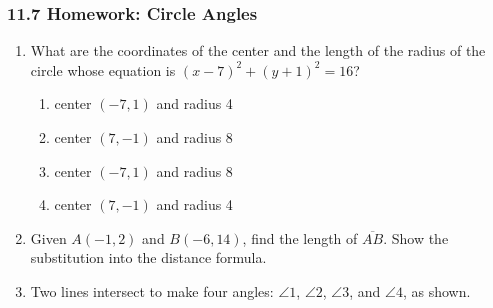 

\fancyhead[LE]{\thepage}



\subsubsection*{11.7 Homework: Circle Angles}
\begin{enumerate}
\item What are the coordinates of the center and the length of the radius of the circle whose equation is $(x-7)^2+(y+1)^2=16$?
  \begin{enumerate}[itemsep=0.25cm]
    \item center $(-7,1)$ and radius 4
    \item center $(7,-1)$ and radius 8
    \item center $(-7,1)$ and radius 8
    \item center $(7,-1)$ and radius 4
  \end{enumerate}

\item Given $A(-1,2)$ and $B(-6,14)$, find the length of $\overline{AB}$. Show the substitution into the distance formula.

\item Two lines intersect to make four angles: $\angle 1$, $\angle 2$, $\angle 3$, and $\angle 4$, as shown.


\end{enumerate}
